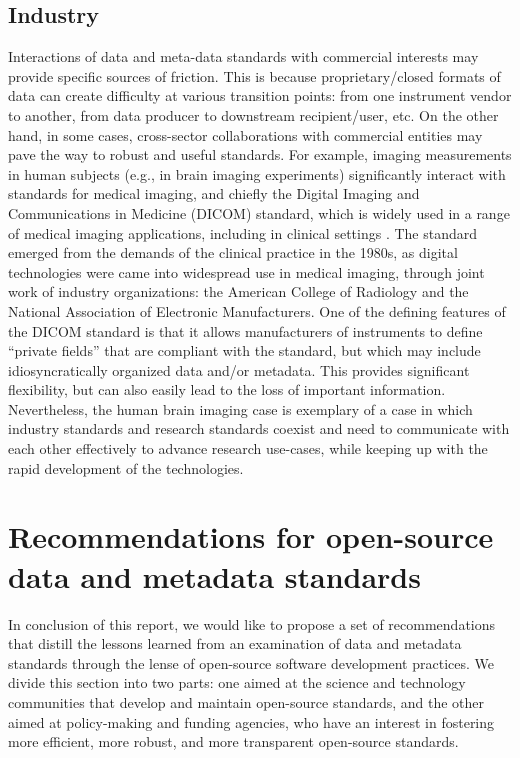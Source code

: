 \documentclass[
  number]{elsarticle}
\begin{document}
\subsection{Industry}\label{industry}

Interactions of data and meta-data standards with commercial interests
may provide specific sources of friction. This is because
proprietary/closed formats of data can create difficulty at various
transition points: from one instrument vendor to another, from data
producer to downstream recipient/user, etc. On the other hand, in some
cases, cross-sector collaborations with commercial entities may pave the
way to robust and useful standards. For example, imaging measurements in
human subjects (e.g., in brain imaging experiments) significantly
interact with standards for medical imaging, and chiefly the Digital
Imaging and Communications in Medicine (DICOM) standard, which is widely
used in a range of medical imaging applications, including in clinical
settings \citep[@Mustra2008-xk]{Larobina2023-vq}. The standard emerged
from the demands of the clinical practice in the 1980s, as digital
technologies were came into widespread use in medical imaging, through
joint work of industry organizations: the American College of Radiology
and the National Association of Electronic Manufacturers. One of the
defining features of the DICOM standard is that it allows manufacturers
of instruments to define ``private fields'' that are compliant with the
standard, but which may include idiosyncratically organized data and/or
metadata. This provides significant flexibility, but can also easily
lead to the loss of important information. Nevertheless, the human brain
imaging case is exemplary of a case in which industry standards and
research standards coexist and need to communicate with each other
effectively to advance research use-cases, while keeping up with the
rapid development of the technologies.

\section{Recommendations for open-source data and metadata
standards}\label{sec-recommendations}

In conclusion of this report, we would like to propose a set of
recommendations that distill the lessons learned from an examination of
data and metadata standards through the lense of open-source software
development practices. We divide this section into two parts: one aimed
at the science and technology communities that develop and maintain
open-source standards, and the other aimed at policy-making and funding
agencies, who have an interest in fostering more efficient, more robust,
and more transparent open-source standards.
\end{document}
